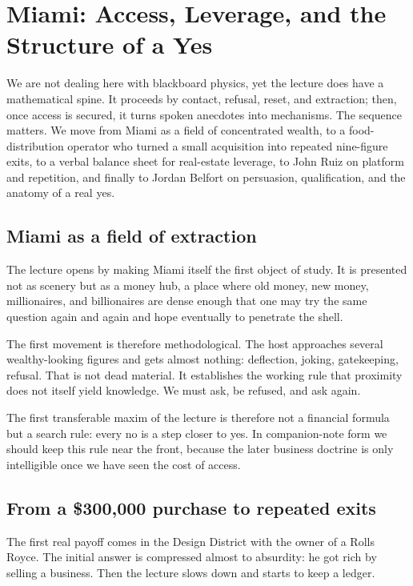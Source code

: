 \chapter{Miami: Access, Leverage, and the Structure of a Yes}

We are not dealing here with blackboard physics, yet the lecture does have a mathematical spine. It proceeds by contact, refusal, reset, and extraction; then, once access is secured, it turns spoken anecdotes into mechanisms. The sequence matters. We move from Miami as a field of concentrated wealth, to a food-distribution operator who turned a small acquisition into repeated nine-figure exits, to a verbal balance sheet for real-estate leverage, to John Ruiz on platform and repetition, and finally to Jordan Belfort on persuasion, qualification, and the anatomy of a real yes.

\section{Miami as a field of extraction}

The lecture opens by making Miami itself the first object of study. It is presented not as scenery but as a money hub, a place where old money, new money, millionaires, and billionaires are dense enough that one may try the same question again and again and hope eventually to penetrate the shell.

The first movement is therefore methodological. The host approaches several wealthy-looking figures and gets almost nothing: deflection, joking, gatekeeping, refusal. That is not dead material. It establishes the working rule that proximity does not itself yield knowledge. We must ask, be refused, and ask again.

The first transferable maxim of the lecture is therefore not a financial formula but a search rule: every no is a step closer to yes. In companion-note form we should keep this rule near the front, because the later business doctrine is only intelligible once we have seen the cost of access.

\section{From a \$300{,}000 purchase to repeated exits}

The first real payoff comes in the Design District with the owner of a Rolls Royce. The initial answer is compressed almost to absurdity: he got rich by selling a business. Then the lecture slows down and starts to keep a ledger.

